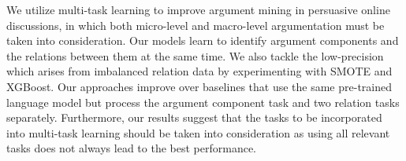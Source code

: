 We utilize multi-task learning to improve argument mining in persuasive online discussions, in which both micro-level and macro-level argumentation must be taken into consideration. Our models learn to identify argument components and the relations between them at the same time. We also tackle the low-precision which arises from imbalanced relation data by experimenting with SMOTE and XGBoost. Our approaches improve over baselines that use the same pre-trained language model but process the argument component task and two relation tasks separately. Furthermore, our results suggest that the tasks to be incorporated into multi-task learning should be taken into consideration as using all relevant tasks does not always lead to the best performance.
